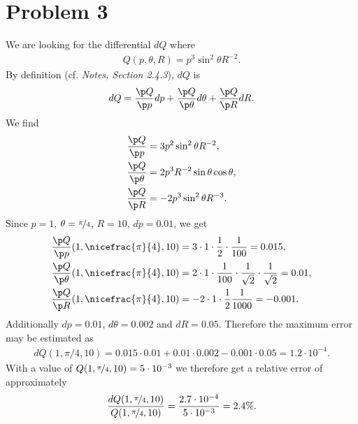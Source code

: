 \documentclass{article}
\begin{document}
\section*{Problem 3}
We are looking for the differential $dQ$ where
\begin{align*}
  Q(p, \theta, R)=p^3\sin^2\theta R^{-2}.
\end{align*}
By definition (cf. \emph{Notes, Section 2.4.3}), $dQ$ is
\begin{align*}
  dQ=\frac{\p Q}{\p p}dp + \frac{\p Q}{\p\theta}d\theta + \frac{\p Q}{\p R}dR.
\end{align*}
We find
\begin{align*}
  \frac{\p Q}{\p p}&= 3p^2\sin^2\theta R^{-2},\\
  \frac{\p Q}{\p\theta}&= 2p^3R^{-2}\sin\theta\cos\theta,\\
  \frac{\p Q}{\p R}&=-2p^3\sin^2\theta R^{-3}.
\end{align*}
Since $p=1$, $\theta=\nicefrac{\pi}{4}$, $R=10$, $dp=0.01$, we get
\begin{align*}
  \frac{\p Q}{\p p}(1, \nicefrac{\pi}{4}, 10)
  &=3\cdot 1 \cdot \frac{1}{2} \cdot \frac{1}{100}=0.015,\\
  \frac{\p Q}{\p\theta}(1, \nicefrac{\pi}{4}, 10)
  &=2\cdot 1 \cdot \frac{1}{100}\cdot\frac{1}{\sqrt{2}}\cdot\frac{1}{\sqrt{2}} =0.01,\\
  \frac{\p Q}{\p R}(1, \nicefrac{\pi}{4}, 10)
  &= -2\cdot 1 \cdot \frac{1}{2}\frac{1}{1000}=-0.001.
\end{align*}
Additionally $dp = 0.01$, $d\theta = 0.002$ and $dR=0.05$.
Therefore the maximum error may be estimated as
\begin{align*}
  dQ(1,\pi/4,10)=0.015\cdot 0.01+0.01\cdot 0.002  -0.001 \cdot 0.05=1.2\cdot10^{-4}.
\end{align*}
With a value of $Q(1,\nicefrac{\pi}{4},10)=5\cdot10^{-3}$ we therefore get a
relative error of approximately 
\begin{align*}
  \frac{dQ(1,\nicefrac{\pi}{4},10)}{Q(1,\nicefrac{\pi}{4},10)}=\frac{2.7\cdot10^{-4}}{5\cdot 10^{-3}}=2.4\%.
\end{align*}
\end{document}
